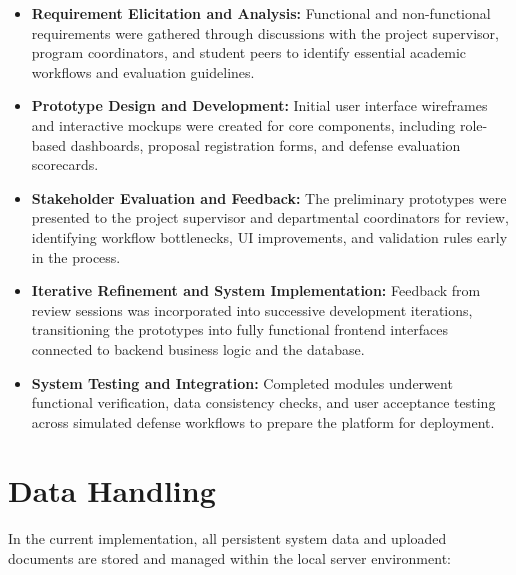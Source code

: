 \documentclass[12pt,a4paper]{report}
\begin{document}
\begin{itemize}
  \item \textbf{Requirement Elicitation and Analysis:} Functional and non-functional requirements were gathered through discussions with the project supervisor, program coordinators, and student peers to identify essential academic workflows and evaluation guidelines.
  
  \item \textbf{Prototype Design and Development:} Initial user interface wireframes and interactive mockups were created for core components, including role-based dashboards, proposal registration forms, and defense evaluation scorecards.
  
  \item \textbf{Stakeholder Evaluation and Feedback:} The preliminary prototypes were presented to the project supervisor and departmental coordinators for review, identifying workflow bottlenecks, UI improvements, and validation rules early in the process.
  
  \item \textbf{Iterative Refinement and System Implementation:} Feedback from review sessions was incorporated into successive development iterations, transitioning the prototypes into fully functional frontend interfaces connected to backend business logic and the database.
  
  \item \textbf{System Testing and Integration:} Completed modules underwent functional verification, data consistency checks, and user acceptance testing across simulated defense workflows to prepare the platform for deployment.
\end{itemize}

\section{Data Handling}
In the current implementation, all persistent system data and uploaded documents are stored and managed within the local server environment:
\end{document}
